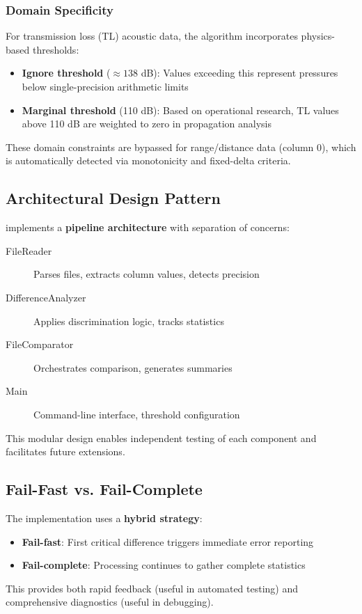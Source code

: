 \subsubsection{Domain Specificity}

For transmission loss (TL) acoustic data, the algorithm incorporates physics-based thresholds:

\begin{itemize}
    \item \textbf{Ignore threshold} ($\approx 138$ dB): Values exceeding this represent pressures below single-precision arithmetic limits
    \item \textbf{Marginal threshold} (110 dB): Based on operational research, TL values above 110 dB are weighted to zero in propagation analysis \cite{doi:10.23919/OCEANS.2009.5422312}
\end{itemize}

These domain constraints are bypassed for range/distance data (column 0), which is automatically detected via monotonicity and fixed-delta criteria.

\subsection{Architectural Design Pattern}

\ubdiff{} implements a \textbf{pipeline architecture} with separation of concerns:

\begin{description}
    \item[FileReader] Parses files, extracts column values, detects precision
    \item[DifferenceAnalyzer] Applies discrimination logic, tracks statistics
    \item[FileComparator] Orchestrates comparison, generates summaries
    \item[Main] Command-line interface, threshold configuration
\end{description}

This modular design enables independent testing of each component and facilitates future extensions.

\subsection{Fail-Fast vs. Fail-Complete}

The implementation uses a \textbf{hybrid strategy}:

\begin{itemize}
    \item \textbf{Fail-fast}: First critical difference triggers immediate error reporting
    \item \textbf{Fail-complete}: Processing continues to gather complete statistics
\end{itemize}

This provides both rapid feedback (useful in automated testing) and comprehensive diagnostics (useful in debugging).
